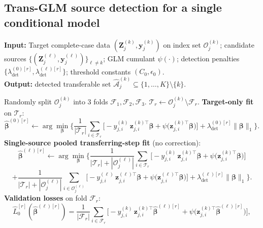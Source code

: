 \subsection{Trans-GLM source detection for a single conditional model}
\begin{algorithm}[H]
\footnotesize
\caption{Trans-GLM source detection for a single conditional model $(k,j)$}
\label{alg:transglm_detect}
\textbf{Input:} Target complete-case data $(\bm{Z}^{(k)}_j,\bm{y}^{(k)}_j)$ on index set $\mathcal{O}^{(k)}_j$;
candidate sources $\{(\bm{Z}^{(\ell)}_j,\bm{y}^{(\ell)}_j)\}_{\ell\neq k}$;
GLM cumulant $\psi(\cdot)$; detection penalties $\{\lambda_{\mathrm{det}}^{(0)[r]},\lambda_{\mathrm{det}}^{(\ell)[r]}\}$;
threshold constants $(C_0,\epsilon_0)$.\\
\textbf{Output:} detected transferable set $\widehat{\mathcal{A}}^{(k)}_j\subseteq\{1,\dots,K\}\setminus\{k\}$.
\begin{algorithmic}[1]
\State Randomly split $\mathcal{O}^{(k)}_j$ into 3 folds $\mathcal{F}_1,\mathcal{F}_2,\mathcal{F}_3$.
  \State $\mathcal{T}_r \leftarrow \mathcal{O}^{(k)}_j\setminus \mathcal{F}_r$.
  \State \textbf{Target-only fit} on $\mathcal{T}_r$:
  \[
    \hat{\bm{\beta}}^{(0)[r]} \leftarrow
    \arg\min_{\bm{\beta}}
    \Bigg\{
      \frac{1}{|\mathcal{T}_r|}
      \sum_{i\in\mathcal{T}_r}\Big[-y^{(k)}_{j,i}\,\bm{z}^{(k)\top}_{j,i}\bm{\beta}+\psi\!\big(\bm{z}^{(k)\top}_{j,i}\bm{\beta}\big)\Big]
      +\lambda_{\mathrm{det}}^{(0)[r]}\|\bm{\beta}\|_1
    \Bigg\}.
  \]
    \State \textbf{Single-source pooled transferring-step fit} (no correction):
    \[
      \hat{\bm{\beta}}^{(\ell)[r]} \leftarrow
      \arg\min_{\bm{\beta}}
      \Bigg\{
        \frac{1}{|\mathcal{T}_r|+|\mathcal{O}^{(\ell)}_j|}
        \sum_{i\in\mathcal{T}_r}\Big[-y^{(k)}_{j,i}\,\bm{z}^{(k)\top}_{j,i}\bm{\beta}+\psi\!\big(\bm{z}^{(k)\top}_{j,i}\bm{\beta}\big)\Big] \]
        \[+\frac{1}{|\mathcal{T}_r|+|\mathcal{O}^{(\ell)}_j|}
        \sum_{i\in\mathcal{O}^{(\ell)}_j}\Big[-y^{(\ell)}_{j,i}\,\bm{z}^{(\ell)\top}_{j,i}\bm{\beta}+\psi\!\big(\bm{z}^{(\ell)\top}_{j,i}\bm{\beta}\big)\Big]
        +\lambda_{\mathrm{det}}^{(\ell)[r]}\|\bm{\beta}\|_1
      \Bigg\}.
    \]
    \State \textbf{Validation losses} on fold $\mathcal{F}_r$:
    \[
      \widehat{L}_0^{[r]}(\hat{\bm{\beta}}^{(\ell)[r]})
      =\frac{1}{|\mathcal{F}_r|}\sum_{i\in\mathcal{F}_r}
      \Big[-y^{(k)}_{j,i}\,\bm{z}^{(k)\top}_{j,i}\hat{\bm{\beta}}^{(\ell)[r]}+\psi\!\big(\bm{z}^{(k)\top}_{j,i}\hat{\bm{\beta}}^{(\ell)[r]}\big)\Big],
\]
\end{algorithmic}
\end{algorithm}
